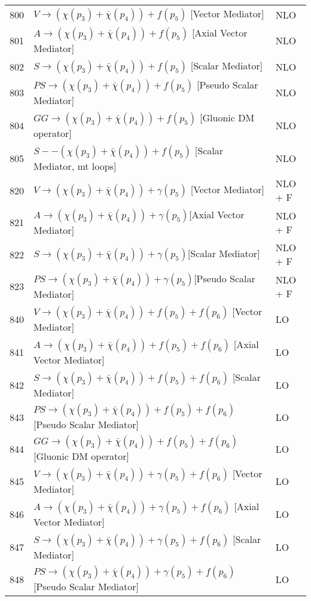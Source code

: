 \documentclass[12pt]{article}
\begin{document}
\begin{table}
\begin{center}
\begin{tabular}{|l|l|l|}
\hline
800 & $ V\to({\chi}(p_3)+\bar{\chi}(p_4)) +f(p_5) $ [Vector Mediator] & NLO \\
801 & $ A\to({\chi}(p_3)+\bar{\chi}(p_4)) +f(p_5)$ [Axial Vector Mediator] & NLO \\
802 & $ S\to({\chi}(p_3)+\bar{\chi}(p_4)) +f(p_5)$ [Scalar Mediator] & NLO \\
803 &  $ PS\to({\chi}(p_3)+\bar{\chi}(p_4)) +f(p_5)$ [Pseudo Scalar Mediator] & NLO \\
804 &  $ GG\to({\chi}(p_3)+\bar{\chi}(p_4)) +f(p_5)$ [Gluonic DM operator]  & NLO \\
805 & $ S--({\chi}(p_3)+\bar{\chi}(p_4)) +f(p_5)$ [Scalar Mediator, mt loops] & NLO \\
\hline
820 & $V\to({\chi}(p_3)+\bar{\chi}(p_4)) +\gamma(p_5)$ [Vector Mediator] & NLO + F \\
821 & $A\to({\chi}(p_3)+\bar{\chi}(p_4)) +\gamma(p_5) $[Axial Vector Mediator] & NLO + F \\
822 & $ S\to({\chi}(p_3)+\bar{\chi}(p_4)) +\gamma(p_5) $[Scalar Mediator] & NLO + F \\
823 &$ PS\to({\chi}(p_3)+\bar{\chi}(p_4)) +\gamma(p_5) $[Pseudo Scalar Mediator] & NLO + F \\
\hline
840 &$ V\to({\chi}(p_3)+\bar{\chi}(p_4)) +f(p_5)+f(p_6)$ [Vector Mediator] & LO\\
841 &$A\to({\chi}(p_3)+\bar{\chi}(p_4)) +f(p_5)+f(p_6)$ [Axial Vector Mediator]  & LO\\
842 &$ S\to({\chi}(p_3)+\bar{\chi}(p_4)) +f(p_5)+f(p_6)$ [Scalar Mediator]  & LO\\
843 &$ PS\to({\chi}(p_3)+\bar{\chi}(p_4)) +f(p_5)+f(p_6)$ [Pseudo Scalar Mediator]  & LO\\
844 &$ GG\to({\chi}(p_3)+\bar{\chi}(p_4)) +f(p_5)+f(p_6)$ [Gluonic DM operator]  & LO\\
\hline
845 & $V\to({\chi}(p_3)+\bar{\chi}(p_4)) +\gamma(p_5)+f(p_6)$ [Vector Mediator]  & LO\\
846 & $A\to({\chi}(p_3)+\bar{\chi}(p_4)) +\gamma(p_5)+f(p_6)$ [Axial Vector Mediator]  & LO\\
847 & $S\to({\chi}(p_3)+\bar{\chi}(p_4)) +\gamma(p_5)+f(p_6)$ [Scalar Mediator]  & LO\\
848 & $PS\to({\chi}(p_3)+\bar{\chi}(p_4)) +\gamma(p_5)+f(p_6)$ [Pseudo Scalar Mediator]  & LO\\

\end{tabular}
\end{center}
\end{table}
\end{document}
